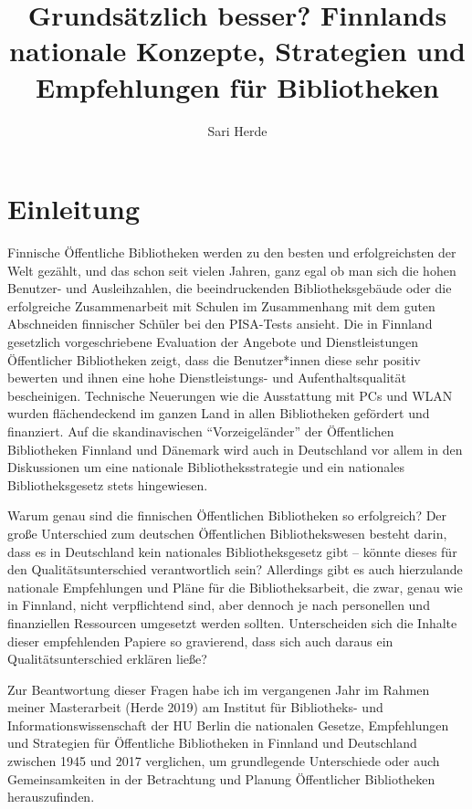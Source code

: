 \documentclass[a4paper,
fontsize=11pt,
oneside,
numbers=noperiodatend,
parskip=half-,
bibliography=totoc,
final
]{scrartcl}
\title{\LARGE{Grundsätzlich besser? Finnlands nationale Konzepte, Strategien und Empfehlungen für Bibliotheken}}%
\author{Sari Herde} %
\date{}
\begin{document}
\maketitle
\thispagestyle{fancyplain} 


\hypertarget{einleitung}{%
\section{Einleitung}\label{einleitung}}

Finnische Öffentliche Bibliotheken werden zu den besten und
erfolgreichsten der Welt gezählt, und das schon seit vielen Jahren, ganz
egal ob man sich die hohen Benutzer- und Ausleihzahlen, die
beeindruckenden Bibliotheksgebäude oder die erfolgreiche Zusammenarbeit
mit Schulen im Zusammenhang mit dem guten Abschneiden finnischer Schüler
bei den PISA-Tests ansieht. Die in Finnland gesetzlich vorgeschriebene
Evaluation der Angebote und Dienstleistungen Öffentlicher Bibliotheken
zeigt, dass die Benutzer*innen diese sehr positiv bewerten und ihnen
eine hohe Dienstleistungs- und Aufenthaltsqualität bescheinigen.
Technische Neuerungen wie die Ausstattung mit PCs und WLAN wurden
flächendeckend im ganzen Land in allen Bibliotheken gefördert und
finanziert. Auf die skandinavischen \enquote{Vorzeigeländer} der
Öffentlichen Bibliotheken Finnland und Dänemark wird auch in Deutschland
vor allem in den Diskussionen um eine nationale Bibliotheksstrategie und
ein nationales Bibliotheksgesetz stets hingewiesen.

Warum genau sind die finnischen Öffentlichen Bibliotheken so
erfolgreich? Der große Unterschied zum deutschen Öffentlichen
Bibliothekswesen besteht darin, dass es in Deutschland kein nationales
Bibliotheksgesetz gibt -- könnte dieses für den Qualitätsunterschied
verantwortlich sein? Allerdings gibt es auch hierzulande nationale
Empfehlungen und Pläne für die Bibliotheksarbeit, die zwar, genau wie in
Finnland, nicht verpflichtend sind, aber dennoch je nach personellen und
finanziellen Ressourcen umgesetzt werden sollten. Unterscheiden sich die
Inhalte dieser empfehlenden Papiere so gravierend, dass sich auch daraus
ein Qualitätsunterschied erklären ließe?

Zur Beantwortung dieser Fragen habe ich im vergangenen Jahr im Rahmen
meiner Masterarbeit (Herde 2019) am Institut für Bibliotheks- und
Informationswissenschaft der HU Berlin die nationalen Gesetze,
Empfehlungen und Strategien für Öffentliche Bibliotheken in Finnland und
Deutschland zwischen 1945 und 2017 verglichen, um grundlegende
Unterschiede oder auch Gemeinsamkeiten in der Betrachtung und Planung
Öffentlicher Bibliotheken herauszufinden.
\end{document}
